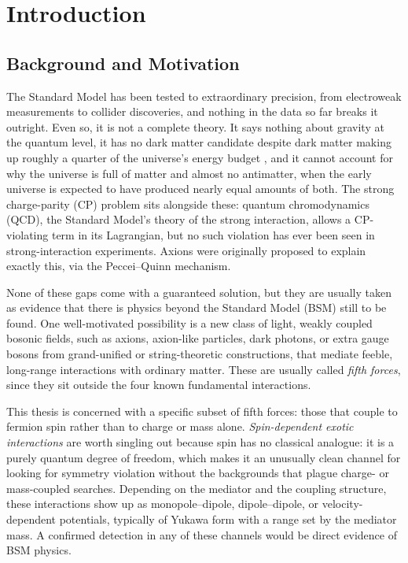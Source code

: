 \documentclass[main]{subfiles}
\begin{document}
\chapter{Introduction}

\section{Background and Motivation}

The Standard Model has been tested to extraordinary precision, from
electroweak measurements to collider discoveries, and nothing in the data so
far breaks it outright. Even so, it is not a complete theory. It says nothing
about gravity at the quantum level, it has no dark matter candidate despite
dark matter making up roughly a quarter of the universe's energy budget
\cite{Planck2018},
and it cannot account for why the universe is full of matter and almost no
antimatter, when the early universe is expected to have produced nearly equal
amounts of both. The strong charge-parity (CP) problem sits alongside these:
quantum chromodynamics (QCD), the Standard Model's theory of the strong
interaction, allows a CP-violating term in its Lagrangian, but no such
violation has ever been seen in strong-interaction experiments. Axions were
originally proposed to explain exactly this, via the Peccei--Quinn mechanism.

None of these gaps come with a guaranteed solution, but they are usually taken
as evidence that there is physics beyond the Standard Model (BSM) still to be
found. One well-motivated possibility is a new class of light, weakly coupled
bosonic fields, such as axions, axion-like particles, dark photons, or extra
gauge bosons from grand-unified or string-theoretic constructions, that
mediate feeble, long-range interactions with ordinary matter. These are usually called
\emph{fifth forces}, since they sit outside the four known fundamental
interactions.

This thesis is concerned with a specific subset of fifth forces: those that
couple to fermion spin rather than to charge or mass alone. \emph{Spin-dependent
exotic interactions} are worth singling out because spin has no classical
analogue: it is a purely quantum degree of freedom, which makes it an
unusually clean channel for looking for symmetry violation without the
backgrounds that plague charge- or mass-coupled searches. Depending on the
mediator and the coupling structure, these interactions show up as
monopole--dipole, dipole--dipole, or velocity-dependent potentials, typically
of Yukawa form with a range set by the mediator mass. A confirmed detection in
any of these channels would be direct evidence of BSM physics.
\end{document}
